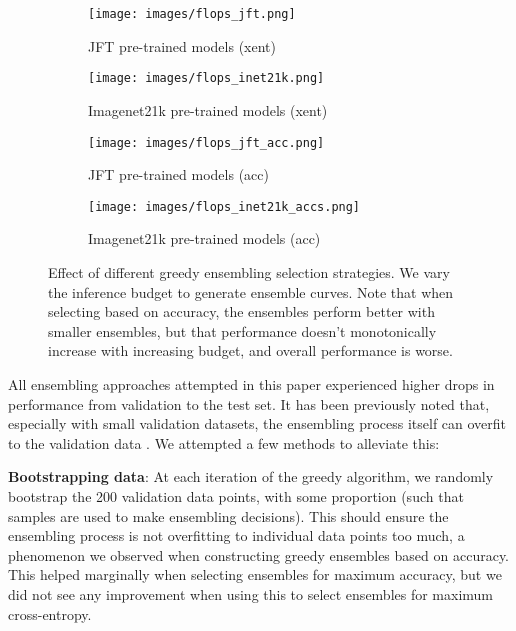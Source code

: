 \documentclass{article} \usepackage{iclr2021_conference,times}
\begin{document}
\begin{figure}[tb]
\centering
\begin{subfigure}{0.64\textwidth}
  \centering
  \texttt{[image: images/flops\_jft.png]}
  \caption{JFT pre-trained models (xent)}
  \label{fig:flops_jft_xent}
\end{subfigure}\begin{subfigure}{.33\textwidth}
  \centering
  \texttt{[image: images/flops\_inet21k.png]}
  \caption{Imagenet21k pre-trained models (xent)}
  \label{fig:flops_inet21k_xent}
\end{subfigure}
\begin{subfigure}{0.64\textwidth}
  \centering
  \texttt{[image: images/flops\_jft\_acc.png]}
  \caption{JFT pre-trained models (acc)}
  \label{fig:flops_jft_acc}
\end{subfigure}\begin{subfigure}{.33\textwidth}
  \centering
  \texttt{[image: images/flops\_inet21k\_accs.png]}
  \caption{Imagenet21k pre-trained models (acc)}
  \label{fig:flops_inet21k_acc}
\end{subfigure}
\caption{Effect of different greedy ensembling selection strategies. We vary the inference budget to generate ensemble curves. Note that when selecting based on accuracy, the ensembles perform better with smaller ensembles, but that performance doesn't monotonically increase with increasing budget, and overall performance is worse.}
\label{fig:xent_vs_acc}
\end{figure}

All ensembling approaches attempted in this paper experienced higher drops in performance from validation to the test set. It has been previously noted that, especially with small validation datasets, the ensembling process itself can overfit to the validation data \citep{caruana2004ensembleselection}. We attempted a few methods to alleviate this:

\textbf{Bootstrapping data}:
    At each iteration of the greedy algorithm, we randomly bootstrap the 200 validation data points, with some proportion  (such that  samples are used to make ensembling decisions). This should ensure the ensembling process is not overfitting to individual data points too much, a phenomenon we observed when constructing greedy ensembles based on accuracy.
    This helped marginally when selecting ensembles for maximum accuracy, but we did not see any improvement when using this to select ensembles for maximum cross-entropy.
    
\end{document}
